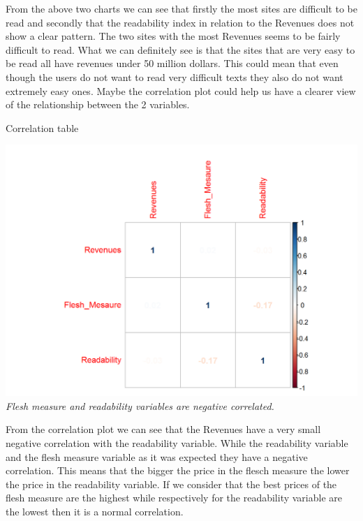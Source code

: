 \documentclass{article}
\begin{document}
From the above two charts we can see that firstly the most sites are difficult to be read and secondly that the readability index in relation to the Revenues does not show a clear pattern. The two sites with the most Revenues seems to be fairly difficult to read. What we can definitely see is that the sites that are very easy to be read all have revenues under 50 million dollars. This could mean that even though the users do not want to read very difficult texts they also do not want extremely easy ones. Maybe the correlation plot could help us have a clearer view of the relationship between the 2 variables.
\begin{table}[H]
\centering
\caption{Correlation table}
\begin{center}
\includegraphics[scale=0.5]{../R/photos/43_read_cor.png}    \\
\textit{Flesh measure and readability variables are negative correlated.}
\end{center}
\end{table}
From the correlation plot we can see that the Revenues have a very small negative correlation with the readability variable. While the readability variable and the flesh measure variable as it was expected they have a negative correlation. This means that the bigger the price in the flesch measure the lower the price in the readability variable. If we consider that the best prices of the flesh measure are the highest while respectively for the readability variable are the lowest then it is a normal correlation.
\end{document}
